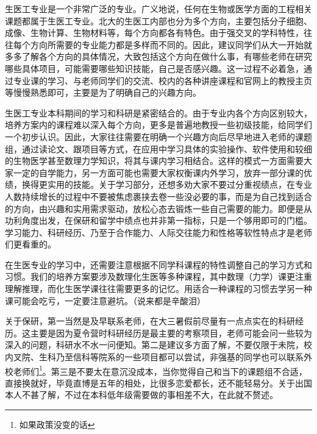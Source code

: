 \documentclass[11pt,oneside]{book}
\begin{document}
生医工专业是一个非常广泛的专业。广义地说，任何在生物或医学方面的工程相关课题都属于生医工专业。北大的生医工内部也分为多个方向，主要包括分子细胞、成像、生物计算、生物材料等，每个方向都各有特色。由于强交叉的学科特性，往往每个方向所需要的专业能力都是多样而不同的。因此，建议同学们从大一开始就多多了解各个方向的具体情况，大致包括这个方向在做什么事，有哪些老师在研究哪些具体项目，可能需要哪些知识技能，自己是否感兴趣。这一过程不必着急，通过专业课的学习、与老师同学们的交流、校内的各种讲座课程和官网上的教授主页等慢慢熟悉即可，主要是为了明确自己的兴趣方向。

\vspace{10pt}

生医工专业本科期间的学习和科研是紧密结合的。由于专业内各个方向区别较大，培养方案内的课程难以深入每个方向，更多是普遍地教授一些初级技能，给同学们一个初步认识。因此，大家往往需要在明确一个兴趣方向后尽早地进入老师的课题组，通过读论文、跟项目等方式，在应用中学习具体的实验操作、软件使用和较细的生物医学甚至数理力学知识，将其与课内学习相结合。这样的模式一方面需要大家一定的自学能力，另一方面可能也需要大家权衡课内外学习，放弃一部分课的优绩，换得更实用的技能。关于学习部分，还想多劝大家不要过分重视绩点，在专业人数持续增长的过程中不要被焦虑裹挟去卷一些没必要的事，而是为自己找到适合的方向，由兴趣和实用需求驱动，放松心态去锻炼一些自己需要的能力。即便是从功利角度出发，在保研和留学中绩点也并非第一指标，只是一个够用即可的门槛。学习能力、科研经历、乃至于合作能力、人际交往能力和性格等软性特点才是老师们更看重的。

\vspace{10pt}

在生医专业的学习中，还需要注意根据不同学科课程的特性调整自己的学习方式和习惯。我们的培养方案要涉及数理化生医等多种课程，其中数理（力学）课更注重理解推理，而化生医学课往往需要更多的记忆。用适合一种课程的习惯去学另一种课可能会吃亏，一定要注意避坑。（说来都是辛酸泪）

\vspace{10pt}

关于保研，第一当然是及早联系老师，在大三暑假前尽量有一点点实在的科研经历。这主要是因为夏令营时科研经历是最主要的考察项目，老师可能会问一些较为深入的问题，科研水不水一问便知。第二是建议多方面了解，不要仅限于未院，校内叉院、生科乃至信科等院系的一些项目都可以尝试，非强基的同学也可以联系外校老师们\footnote{如果政策没变的话}。第三是不要太在意沉没成本，当你觉得自己和当下的课题组不合适，直接换就好，毕竟直博是五年的相处，比很多恋爱都长，还不能轻易分。关于出国本人不甚了解，不过在本科低年级需要做的事相差不大，在此就不赘述。

\vspace{10pt}
\end{document}
